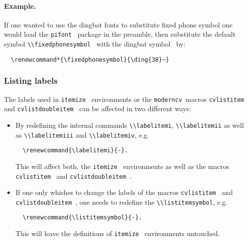 \documentclass[a4paper,11pt]{article}
\newcommand{\code}[1]{\lstinline!#1!}
\newcommand{\Code}[1]{\lstinline!#1!~} %
\newcommand{\Moderncv}{\Code{moderncv}}
\begin{document}
\paragraph{Example.}
If one wanted to use the dingbat fonts to substitute fixed phone symbol one would load the \Code{pifont} package in the preamble, then substitute the default symbol \Code{\\fixedphonesymbol} with the dingbat symbol \ by:
\begin{lstlisting}
  \renewcommand*{\fixedphonesymbol}{\ding{38}~}
\end{lstlisting} 

\subsubsection{Listing labels}
The labels used in \Code{itemize} environments or the \Moderncv macros \code{cvlistitem} and \Code{cvlistdoubleitem} can be affected in two different ways:

\begin{itemize}
 \item By redefining the internal commands \code{\\labelitemi}, \code{\\labelitemii} as well as
  \code{\\labelitemiii} and \code{\\labelitemiv}, e.g. 
  \begin{lstlisting}
  \renewcommand{\labelitemi}{-}.
  \end{lstlisting}
  This will affect both, the \Code{itemize} environments as well as the macros \Code{cvlistitem} and \Code{cvlistdoubleitem}.
  \item If one only whishes to change the labels of the macros \Code{cvlistitem} and \Code{cvlistdoubleitem}, one needs to redefine the \code{\\listitemsymbol}, e.g.
\begin{lstlisting}
  \renewcommand{\listitemsymbol}{-}.
\end{lstlisting}
This will leave the definitions of \Code{itemize} environments untouched.
\end{itemize}
\end{document}
